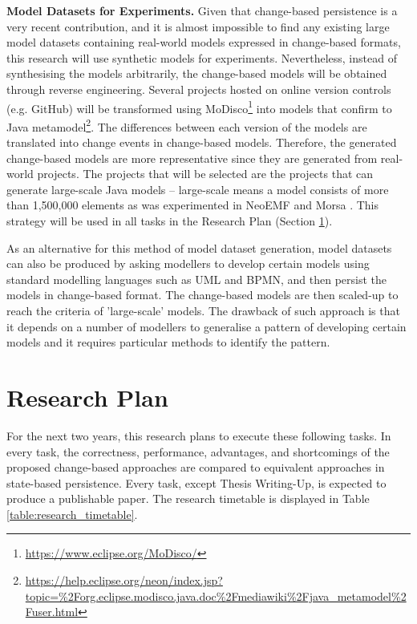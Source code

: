 \documentclass[12pt, a4paper]{report} \usepackage[titletoc]{appendix}
\begin{document}
\textbf{Model Datasets for Experiments.} Given that change-based persistence is a very recent contribution, and it is almost impossible to find any existing large model datasets containing real-world models expressed in change-based formats, this research will use synthetic models for experiments. Nevertheless, instead of synthesising the models arbitrarily, the change-based models will be obtained through reverse engineering. Several projects hosted on online version controls (e.g. GitHub) will be transformed using MoDisco\footnote{\url{https://www.eclipse.org/MoDisco/}} into models that confirm to Java metamodel\footnote{\url{https://help.eclipse.org/neon/index.jsp?topic=\%2Forg.eclipse.modisco.java.doc\%2Fmediawiki\%2Fjava_metamodel\%2Fuser.html}}. The differences between each version of the models are translated into change events in change-based models. Therefore, the generated change-based models are more representative since they are generated from real-world projects. The projects that will be selected are the projects that can generate large-scale Java models -- large-scale means a model consists of more than 1,500,000 elements as was experimented in NeoEMF \cite{daniel2016neoemf} and Morsa \cite{pagan2011morsa}. This strategy will be used in all tasks in the Research Plan (Section \ref{ch:research_plan}).

As an alternative for this method of model dataset generation, model datasets can also be produced by asking modellers to develop certain models using standard modelling languages such as UML and BPMN, and then persist the models in change-based format. The change-based models are then scaled-up to reach the criteria of 'large-scale' models. The drawback of such approach is that it depends on a number of modellers to generalise a pattern of developing certain models and it requires particular methods to identify the pattern.

\chapter{Research Plan}
\label{ch:research_plan}
For the next two years, this research plans to execute these following tasks. In every task, the correctness, performance, advantages, and shortcomings of the proposed change-based approaches are compared to equivalent approaches in state-based persistence. Every task, except Thesis Writing-Up, is expected to produce a publishable paper. The research timetable is displayed in Table \ref{table:research_timetable}.
\end{document}
